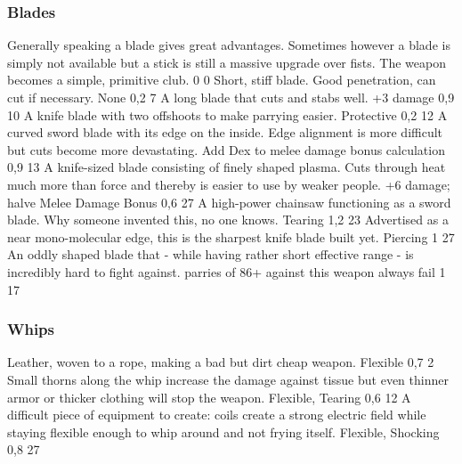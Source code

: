 \subsubsection{Blades}
\vspace{8mm}
\begin{multicols}{2}
    {Generally speaking a blade gives great advantages.
        Sometimes however a blade is simply not available but a stick is still a massive upgrade over fists.}
    {The weapon becomes a simple, primitive club.}
    {0}
    {0}
    {}
    {Short, stiff blade. Good penetration, can cut if necessary.}
    {None
	}{0,2}
    {7}
    {}
    {A long blade that cuts and stabs well.}
    {+3 damage}
    {0,9}
    {10}
    {}
    {A knife blade with two offshoots to make parrying easier.}
    {Protective}
    {0,2}
    {12}
    {}
    {A curved sword blade with its edge on the inside.
        Edge alignment is more difficult but cuts become more devastating.}
    {Add Dex to melee damage bonus calculation}
    {0,9}
    {13}
    {}
    {A knife-sized blade consisting of finely shaped plasma.
        Cuts through heat much more than force and thereby is easier to use by weaker people.}
    {+6 damage; halve Melee Damage Bonus}
    {0,6}
    {27}
    {}
    {A high-power chainsaw functioning as a sword blade.
        Why someone invented this, no one knows.}
    {Tearing}
    {1,2}
    {23}
    {}
    {Advertised as a near mono-molecular edge,
        this is the sharpest knife blade built yet.}
    {Piercing}
    {1}
    {27}
    {}
    {An oddly shaped blade that
        - while having rather short effective range
        - is incredibly hard to fight against.}
    {parries of 86+ against this weapon always fail}
    {1}
    {17}
    {}
\end{multicols}

\subsubsection{Whips}
\vspace{8mm}
\begin{multicols}{2}
    {Leather, woven to a rope, making a bad but dirt cheap weapon.}
    {Flexible}
    {0,7}
    {2}
    {}
    {Small thorns along the whip increase the damage against tissue
        but even thinner armor or thicker clothing will stop the weapon.}
    {Flexible, Tearing}
    {0,6}
    {12}
    {}
    {A difficult piece of equipment to create:
        coils create a strong electric field while staying flexible enough to whip around
        and not frying itself.}
    {Flexible, Shocking}
    {0,8}
    {27}
    {}
\end{multicols}

